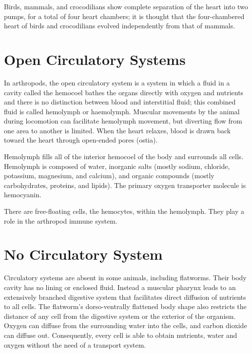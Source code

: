 Birds, mammals, and crocodilians show complete separation of the heart into two pumps, for a total of four heart chambers; it is thought that the four-chambered heart of birds and crocodilians evolved independently from that of mammals.

\hypertarget{open-circulatory-systems}{%
\section{Open Circulatory Systems}\label{open-circulatory-systems}}

In arthropods, the open circulatory system is a system in which a fluid in a cavity called the hemocoel bathes the organs directly with oxygen and nutrients and there is no distinction between blood and interstitial fluid; this combined fluid is called hemolymph or haemolymph. Muscular movements by the animal during locomotion can facilitate hemolymph movement, but diverting flow from one area to another is limited. When the heart relaxes, blood is drawn back toward the heart through open-ended pores (ostia).

Hemolymph fills all of the interior hemocoel of the body and surrounds all cells. Hemolymph is composed of water, inorganic salts (mostly sodium, chloride, potassium, magnesium, and calcium), and organic compounds (mostly carbohydrates, proteins, and lipids). The primary oxygen transporter molecule is hemocyanin.

There are free-floating cells, the hemocytes, within the hemolymph. They play a role in the arthropod immune system.

\hypertarget{no-circulatory-system}{%
\section{No Circulatory System}\label{no-circulatory-system}}

Circulatory systems are absent in some animals, including flatworms. Their body cavity has no lining or enclosed fluid. Instead a muscular pharynx leads to an extensively branched digestive system that facilitates direct diffusion of nutrients to all cells. The flatworm's dorso-ventrally flattened body shape also restricts the distance of any cell from the digestive system or the exterior of the organism. Oxygen can diffuse from the surrounding water into the cells, and carbon dioxide can diffuse out. Consequently, every cell is able to obtain nutrients, water and oxygen without the need of a transport system.

